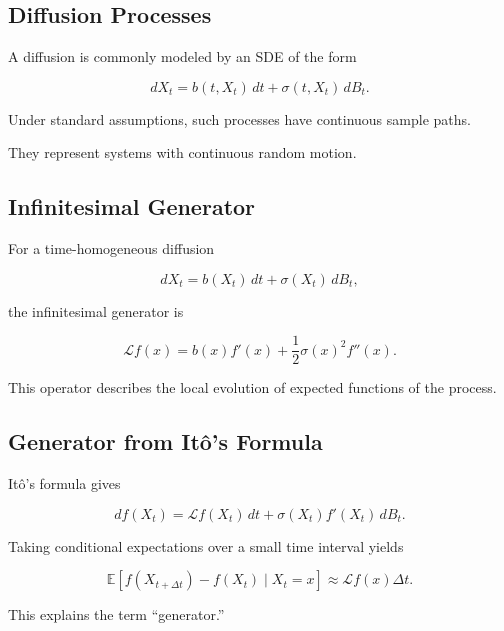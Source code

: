\subsection{Diffusion Processes}
\label{subsec:diffusion-processes}

A diffusion is commonly modeled by an SDE of the form

\[
\boxed{
dX_t
=
b(t,X_t)\,dt
+
\sigma(t,X_t)\,dB_t.
}
\]

Under standard assumptions, such processes have continuous sample paths.

They represent systems with continuous random motion.

\subsection{Infinitesimal Generator}
\label{subsec:sde-generator}

For a time-homogeneous diffusion

\[
dX_t
=
b(X_t)\,dt
+
\sigma(X_t)\,dB_t,
\]

the infinitesimal generator is

\[
\boxed{
\mathcal{L}f(x)
=
b(x)f'(x)
+
\frac12
\sigma(x)^2f''(x).
}
\]

This operator describes the local evolution of expected functions of
the process.

\subsection{Generator from It\^o's Formula}
\label{subsec:generator-from-ito}

It\^o's formula gives

\[
df(X_t)
=
\mathcal{L}f(X_t)\,dt
+
\sigma(X_t)f'(X_t)\,dB_t.
\]

Taking conditional expectations over a small time interval yields

\[
\boxed{
\mathbb{E}
[
f(X_{t+\Delta t})-f(X_t)
\mid
X_t=x
]
\approx
\mathcal{L}f(x)\Delta t.
}
\]

This explains the term ``generator.''

